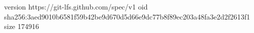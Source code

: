 version https://git-lfs.github.com/spec/v1
oid sha256:3aed9010b6581f59b42be9d670d5d66e9dc77b8f89ec203a48fa3e2d2f2613f1
size 174916
